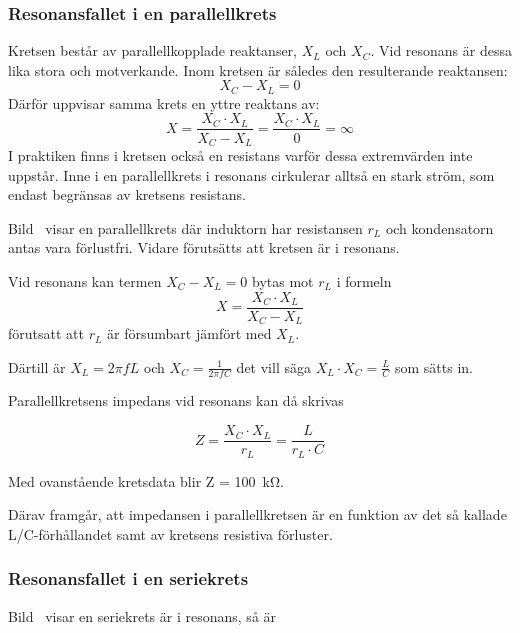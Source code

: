 \subsubsection{Resonansfallet i en parallellkrets}
\label{parallellresonans}


Kretsen består av parallellkopplade reaktanser, \(X_L\) och \(X_C\).
Vid resonans är dessa lika stora och motverkande.
Inom kretsen är således den resulterande reaktansen:
%
\[X_C - X_L = 0\]
%
Därför uppvisar samma krets en yttre reaktans av:
%
\[
  X = \frac{X_C \cdot X_L}{X_C - X_L}
  = \frac{X_C \cdot X_L}{0}
  = \infty
\]
%
I praktiken finns i kretsen också en resistans varför dessa extremvärden inte
uppstår.
Inne i en parallellkrets i resonans cirkulerar alltså en stark ström,
som endast begränsas av kretsens resistans.

Bild~ visar en parallellkrets där induktorn har
resistansen \(r_L\) och kondensatorn antas vara förlustfri.
Vidare förutsätts att kretsen är i resonans.

Vid resonans kan termen \(X_C - X_L = 0\) bytas mot \(r_L\) i formeln
\[X = \frac{X_C \cdot X_L}{X_C - X_L}\] förutsatt att \(r_L\) är försumbart
jämfört med \(X_L\).

Därtill är \(X_L = 2\pi fL\) och \(X_C = \frac{1}{2\pi fC}\) det vill säga
\(X_L \cdot X_C = \frac{L}{C}\) som sätts in.

Parallellkretsens impedans vid resonans kan då skrivas

\[
Z = \frac{X_C \cdot X_L}{r_L} = \frac{L}{r_L \cdot C}
\]

Med ovanstående kretsdata blir Z = \qty{100}{\kilo\ohm}.

Därav framgår, att impedansen i parallellkretsen är en funktion av det så
kallade L/C-förhållandet samt av kretsens resistiva förluster.

\subsubsection{Resonansfallet i en seriekrets}
\label{serieresonans}


Bild~ visar en seriekrets är i resonans, så är

